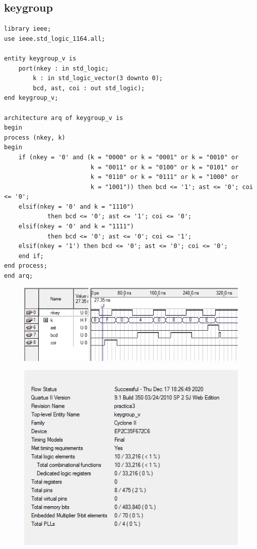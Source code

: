 \documentclass[12pt, a4papre]{article}
\begin{document}
\subsection{keygroup}
		\begin{lstlisting}[style=vhdl, frame=single, basicstyle=\tiny]
	library ieee;
use ieee.std_logic_1164.all;

entity keygroup_v is
	port(nkey : in std_logic;
		k : in std_logic_vector(3 downto 0);
		bcd, ast, coi : out std_logic);
end keygroup_v;

architecture arq of keygroup_v is
begin
process (nkey, k)
begin
	if (nkey = '0' and (k = "0000" or k = "0001" or k = "0010" or
						k = "0011" or k = "0100" or k = "0101" or
						k = "0110" or k = "0111" or k = "1000" or
						k = "1001")) then bcd <= '1'; ast <= '0'; coi <= '0';
	elsif(nkey = '0' and k = "1110")
			then bcd <= '0'; ast <= '1'; coi <= '0';
	elsif(nkey = '0' and k = "1111")
			then bcd <= '0'; ast <= '0'; coi <= '1';
	elsif(nkey = '1') then bcd <= '0'; ast <= '0'; coi <= '0';
	end if;
end process;
end arq;
		\end{lstlisting}
		
			\begin{figure}[H]
		\begin{center}
		\includegraphics[width=130mm]{simulaciokeygroup.jpeg}
		\end{center}
	\end{figure}	
	
	
	
			\begin{figure}[H]
		\begin{center}
		\includegraphics[width=130mm]{informeKeygroup.jpeg}
		\end{center}
	\end{figure}	
	
\end{document}
